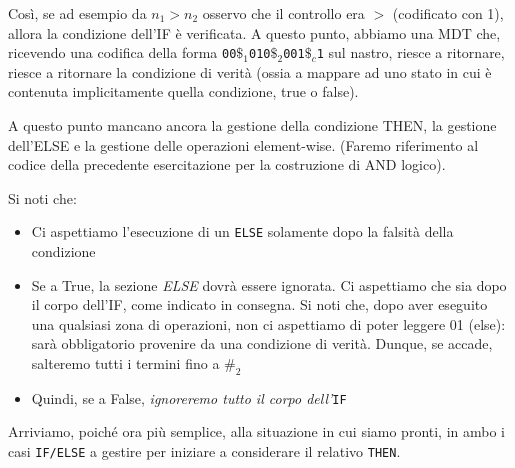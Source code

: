 \documentclass[a4paper,10pt]{article}
\begin{document}
{\begin{itemize}[label=, leftmargin=0pt]
\begin{osservazioni}
{\begin{center}
    \end{center}
    }
Così, se ad esempio da $n_1>n_2$ osservo che il controllo era $>$ (codificato con 1), allora la condizione dell'IF è verificata. A questo punto, abbiamo una MDT che, ricevendo una codifica della forma \texttt{00$\$_1$010$\$_2$001$\$_c$1} sul nastro, riesce a ritornare, riesce a ritornare la condizione di verità (ossia a mappare ad uno stato in cui è contenuta implicitamente quella condizione, true o false). 


A questo punto mancano ancora la gestione della condizione THEN, la gestione dell'ELSE e la gestione delle operazioni element-wise. (Faremo riferimento al codice della precedente esercitazione per la costruzione di AND logico).

Si noti che:
\begin{itemize}
    \item Ci aspettiamo l'esecuzione di un \texttt{ELSE} solamente dopo la falsità della condizione
    \item Se a True, la sezione \textit{ELSE} dovrà essere ignorata. Ci aspettiamo che sia dopo il corpo dell'IF, come indicato in consegna. Si noti che, dopo aver eseguito una qualsiasi zona di operazioni, non ci aspettiamo di poter leggere 01 (else): sarà obbligatorio provenire da una condizione di verità. Dunque, se accade, salteremo tutti i termini fino a $\#_2$
    \item Quindi, se a False, \textit{ignoreremo tutto il corpo dell'}\texttt{IF}
\end{itemize}

Arriviamo, poiché ora più semplice, alla situazione in cui siamo pronti, in ambo i casi \texttt{IF/ELSE} a gestire per iniziare a considerare il relativo \texttt{THEN}. 


{
    \small
    \begin{center}
\end{center}}
\end{osservazioni}
\end{itemize}}
\end{document}
